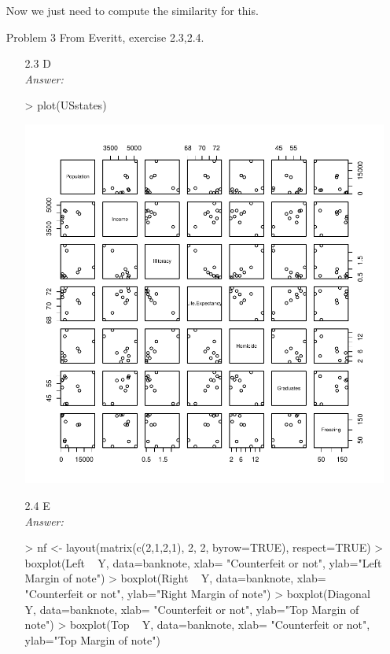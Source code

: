 \documentclass{article}
\begin{document}
\begin{enumerate}
Now we just need to compute the similarity for this.\\
	
	\item[Problem] 3  From Everitt, exercise 2.3,2.4.
		\begin{enumerate}
			\item[2.3] D\\
			\emph{Answer:}
\begin{Schunk}
\begin{Sinput}
> plot(USstates)
\end{Sinput}
\end{Schunk}
\includegraphics{debseal_HW2-002}
			\item[2.4] E\\
			\emph{Answer:} \\
			\begin{center}
\begin{Schunk}
\begin{Sinput}
> nf <- layout(matrix(c(2,1,2,1), 2, 2, byrow=TRUE), respect=TRUE)
> boxplot(Left ~ Y, data=banknote, xlab= "Counterfeit or not", ylab="Left Margin of note")
> boxplot(Right ~ Y, data=banknote, xlab= "Counterfeit or not", ylab="Right Margin of note")
> boxplot(Diagonal ~ Y, data=banknote, xlab= "Counterfeit or not", ylab="Top Margin of note")
> boxplot(Top ~ Y, data=banknote, xlab= "Counterfeit or not", ylab="Top Margin of note")

\end{Sinput}
\end{Schunk}
\end{center}
\end{enumerate}
\end{enumerate}
\end{document}
